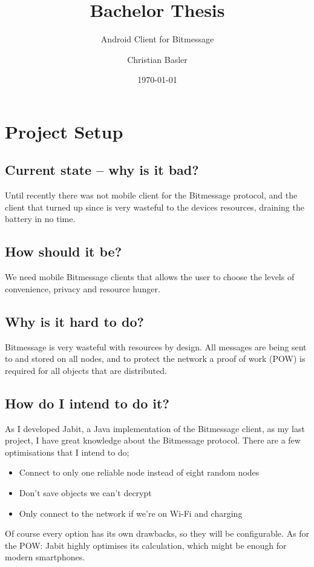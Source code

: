 \documentclass{bfh}
\title{Bachelor Thesis}
\subtitle{Android Client for Bitmessage}
\author{Christian Basler}
\date{\today}
\begin{document}
  \maketitle

  \tableofcontents
  \newpage

  \section{Project Setup}

  \subsection{Current state -- why is it bad?}
  Until recently there was not mobile client for the Bitmessage protocol, and the client that turned up since is very wasteful to the devices resources, draining the battery in no time.

  \subsection{How should it be?}
  We need mobile Bitmessage clients that allows the user to choose the levels of convenience, privacy and resource hunger.

  \subsection{Why is it hard to do?}
  Bitmessage is very wasteful with resources by design. All messages are being sent to and stored on all nodes, and to protect the network a proof of work (POW) is required for all objects that are distributed.

  \subsection{How do I intend to do it?}
  As I developed Jabit, a Java implementation of the Bitmessage client, as my last project, I have great knowledge about the Bitmessage protocol. There are a few optimisations that I intend to do;
  \begin{itemize}
    \item Connect to only one reliable node instead of eight random nodes
    \item Don't save objects we can't decrypt
    \item Only connect to the network if we're on Wi-Fi and charging
  \end{itemize}
  Of course every option has its own drawbacks, so they will be configurable. As for the POW: Jabit highly optimises its calculation, which might be enough for modern smartphones.
\end{document}
